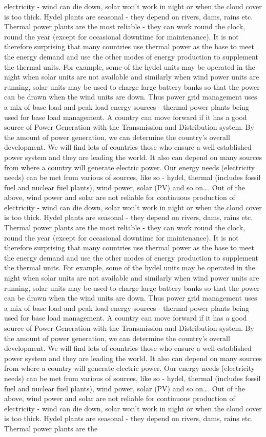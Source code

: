 \documentclass[10pt, a4paper]{article}
\begin{document}
electricity - wind can die down, solar won’t work in night or when the cloud cover is too thick. Hydel plants are seasonal - they depend on rivers, dams, rains etc. Thermal power plants are the most reliable - they can work round the clock, round the year (except for occasional downtime for maintenance). It is not therefore surprising that many countries use thermal power as the base to meet the energy demand and use the other modes of energy production to supplement the thermal units. For example, some of the hydel units may be operated in the night when solar units are not available and similarly when wind power units are running, solar units may be used to charge large battery banks so that the power can be drawn when the wind units are down. Thus power grid management uses a mix of base load and peak load energy sources - thermal power plants being used for base load management. A country can move forward if it has a good source of Power Generation with the Transmission and Distribution system. By the amount of power generation, we can determine the country’s overall development. We will find lots of countries those who ensure a well-established power system and they are leading the world. It also can depend on many sources from where a country will generate electric power. Our energy needs (electricity needs) can be met from various of sources, like so - hydel, thermal (includes fossil fuel and nuclear fuel plants), wind power, solar (PV) and so on\dots. Out of the above, wind power and solar are not reliable for continuous production of electricity - wind can die down, solar won’t work in night or when the cloud cover is too thick. Hydel plants are seasonal - they depend on rivers, dams, rains etc. Thermal power plants are the most reliable - they can work round the clock, round the year (except for occasional downtime for maintenance). It is not therefore surprising that many countries use thermal power as the base to meet the energy demand and use the other modes of energy production to supplement the thermal units. For example, some of the hydel units may be operated in the night when solar units are not available and similarly when wind power units are running, solar units may be used to charge large battery banks so that the power can be drawn when the wind units are down. Thus power grid management uses a mix of base load and peak load energy sources - thermal power plants being used for base load management. A country can move forward if it has a good source of Power Generation with the Transmission and Distribution system. By the amount of power generation, we can determine the country’s overall development. We will find lots of countries those who ensure a well-established power system and they are leading the world. It also can depend on many sources from where a country will generate electric power. Our energy needs (electricity needs) can be met from various of sources, like so - hydel, thermal (includes fossil fuel and nuclear fuel plants), wind power, solar (PV) and so on\dots. Out of the above, wind power and solar are not reliable for continuous production of electricity - wind can die down, solar won’t work in night or when the cloud cover is too thick. Hydel plants are seasonal - they depend on rivers, dams, rains etc. Thermal power plants are the 
\end{document}
